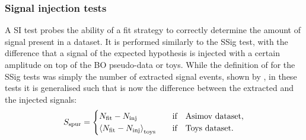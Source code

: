 



\subsubsection{Signal injection tests}
\label{subsubsec:bkg:modeling:sigbkg:sitest}

A \acf{SI} test probes the ability of a fit strategy to correctly determine the amount of signal present in a dataset. It is performed similarly to the \ac{SSig} test, with the difference that a signal of the expected hypothesis is injected with a certain amplitude on top of the \ac{BO} pseudo-data or toys. While the definition of \sspur for the \ac{SSig} tests was simply the number of extracted signal events, shown by \Eqn{\ref{eq:bkg:modeling:sigbkg:sstest:sspur_definition_sstest}}, in these tests it is generalised such that \sspur is now the difference between the extracted and the injected signals:
\begin{equation}
    \label{eq:bkg:modeling:sigbkg:sitest:sspur_definition}
    \sspur = 
    \begin{cases}
        N_{\text{fit}} - N_{\text{inj}} & \qif \text{Asimov dataset},\\
        \expval{N_{\text{fit}} - N_{\text{inj}}}_{\text{toys}} & \qif \text{Toys dataset}.
    \end{cases}
\end{equation}

